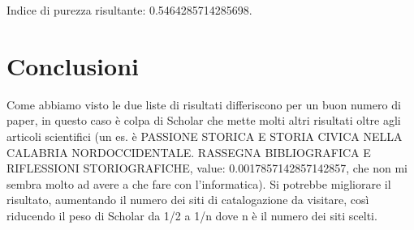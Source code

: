 \documentclass[12pt]{article}
\begin{document}
Indice di purezza risultante: 0.5464285714285698.

\section{Conclusioni}
Come abbiamo visto le due liste di risultati differiscono per un buon numero di paper, in questo caso \`e colpa di Scholar che mette molti altri risultati oltre agli articoli scientifici (un es. \`e PASSIONE STORICA E STORIA CIVICA NELLA CALABRIA NORDOCCIDENTALE. RASSEGNA BIBLIOGRAFICA E RIFLESSIONI STORIOGRAFICHE, value: 0.0017857142857142857, che non mi sembra molto ad avere a che fare con l'informatica). Si potrebbe migliorare il risultato, aumentando il numero dei siti di catalogazione da visitare, cos\`i riducendo il peso di Scholar da 1/2 a 1/n dove n è il numero dei siti scelti.
\end{document}
